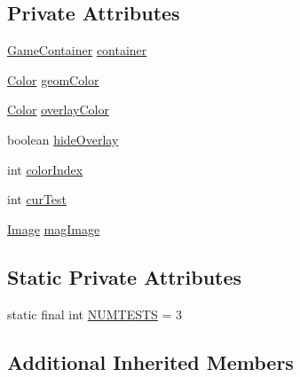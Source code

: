 \subsection*{Private Attributes}
\begin{DoxyCompactItemize}
\item 
\mbox{\hyperlink{classorg_1_1newdawn_1_1slick_1_1_game_container}{Game\+Container}} \mbox{\hyperlink{classorg_1_1newdawn_1_1slick_1_1tests_1_1_geom_accuracy_test_aa36ef5e207393c1e48bdc579da524cf0}{container}}
\item 
\mbox{\hyperlink{classorg_1_1newdawn_1_1slick_1_1_color}{Color}} \mbox{\hyperlink{classorg_1_1newdawn_1_1slick_1_1tests_1_1_geom_accuracy_test_a9e3a8cc2f12479af231295fcd97a47cc}{geom\+Color}}
\item 
\mbox{\hyperlink{classorg_1_1newdawn_1_1slick_1_1_color}{Color}} \mbox{\hyperlink{classorg_1_1newdawn_1_1slick_1_1tests_1_1_geom_accuracy_test_aff160497b9c7289f4a9a7f17dbcdcdf2}{overlay\+Color}}
\item 
boolean \mbox{\hyperlink{classorg_1_1newdawn_1_1slick_1_1tests_1_1_geom_accuracy_test_a8bf56aed165a599089d1f85d30422e8a}{hide\+Overlay}}
\item 
int \mbox{\hyperlink{classorg_1_1newdawn_1_1slick_1_1tests_1_1_geom_accuracy_test_ab0114c968f3579a065cdf7304aeade3e}{color\+Index}}
\item 
int \mbox{\hyperlink{classorg_1_1newdawn_1_1slick_1_1tests_1_1_geom_accuracy_test_af77c3724514db2ec92fcaddf834ca506}{cur\+Test}}
\item 
\mbox{\hyperlink{classorg_1_1newdawn_1_1slick_1_1_image}{Image}} \mbox{\hyperlink{classorg_1_1newdawn_1_1slick_1_1tests_1_1_geom_accuracy_test_a29113b87453f7bebdf3ced47b8055164}{mag\+Image}}
\end{DoxyCompactItemize}
\subsection*{Static Private Attributes}
\begin{DoxyCompactItemize}
\item 
static final int \mbox{\hyperlink{classorg_1_1newdawn_1_1slick_1_1tests_1_1_geom_accuracy_test_a940d03b7b0f9693086275c05cb2b30cb}{N\+U\+M\+T\+E\+S\+TS}} = 3
\end{DoxyCompactItemize}
\subsection*{Additional Inherited Members}


